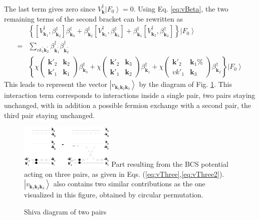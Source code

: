 \documentclass[aps,prb,superscriptaddress,twocolumn]{revtex4}
\newcommand{\vk}{\ensuremath{\mathbf{k}}}
\begin{document}
The last term gives zero since $V^{\dagger}_\vk\left|F_0\right>  =0$. Using
Eq. \eqref{eq:vBeta}, the two remaining terms of the second bracket can be
rewritten as 
\begin{equation}  \label{eq:vThree2}
\begin{split}
&\left\{\left[V^{\dagger}_{\mathbf{k} _1},\beta^{\dagger}_{\mathbf{k} _2}%
\right]  \beta^{\dagger}_{\mathbf{k} _3}+\beta^{\dagger}_{\mathbf{k} _2}%
\left[V^{\dagger}_{\mathbf{k} _1},\beta^{\dagger}_{\mathbf{k} _3}\right] 
+\beta^{\dagger}_{\mathbf{k} _1}\left[V^{\dagger}_{\mathbf{k}
_2},\beta^{\dagger}_{\mathbf{k} _3}\right]  \right\} \left|F_0\right>   \\
=&\sum_{vk^{\prime}_1\mathbf{k} ^{\prime}_2}\beta^{\dagger}_{\mathbf{k}
^{\prime}_1}\beta^{\dagger}_{\mathbf{k} ^{\prime}_2} \\
&\left\{\chi\left(\begin{smallmatrix}\vk'_2&\vk_2\\\vk'_1&\vk_1%
\end{smallmatrix}\right)  \beta^{\dagger}_{\mathbf{k} _3}+\chi\left(%
\begin{smallmatrix}\vk'_2&\vk_3\\\vk'_1&\vk_2\end{smallmatrix}\right) 
\beta^{\dagger}_{\mathbf{k} _1}+\chi\left(\begin{smallmatrix}\vk'_2&\vk_1\%
\\vk'_1&\vk_3\end{smallmatrix}\right)  \beta^{\dagger}_{\mathbf{k}
_2}\right\} \left|F_0\right>  
\end{split}%
\end{equation}
This leads to represent the vector $\left|v_{\mathbf{k} _1\mathbf{k} _2%
\mathbf{k} _3}\right> $ by the diagram of Fig. \ref{fig:threeP}. This
interaction term corresponds to interactions inside a single pair, two pairs
staying unchanged, with in addition a possible fermion exchange with a
second pair, the third pair staying unchanged. 
\begin{figure}[htb]
\caption{Shiva diagram of two pairs }
\label{fig:threeP}
   \includegraphics[width=0.4\textwidth]{threePair.eps}
Part resulting from the BCS potential acting on three pairs, as given in
Eqs. (\ref{eq:vThree},\ref{eq:vThree2}). $\left|v_{\mathbf{k} _1\mathbf{k} _2%
\mathbf{k} _3}\right> $ also contains two similar contributions as the one
visualized in this figure, obtained by circular permutation.
\end{figure}
\end{document}
